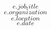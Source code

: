 

\begin{cventries}

  \cventry
    {$$e.job_title$$} %
    {$$e.organization$$} %
    {$$e.location$$} %
    {$$e.date$$} %
    {}
\end{cventries}
